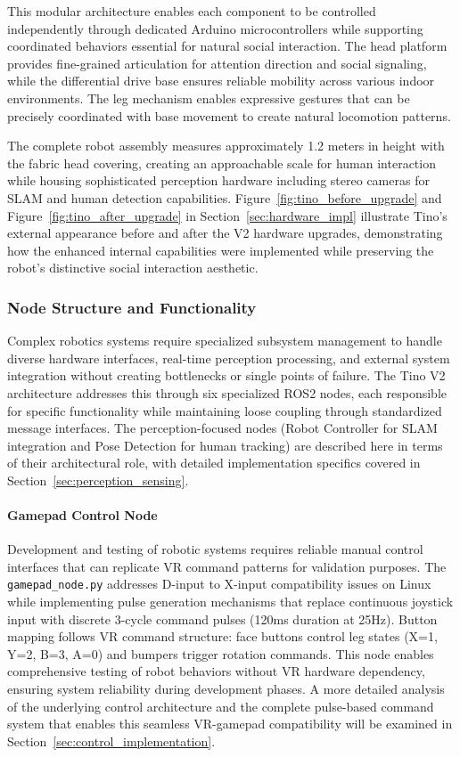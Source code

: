 This modular architecture enables each component to be controlled independently through dedicated Arduino microcontrollers while supporting coordinated behaviors essential for natural social interaction. The head platform provides fine-grained articulation for attention direction and social signaling, while the differential drive base ensures reliable mobility across various indoor environments. The leg mechanism enables expressive gestures that can be precisely coordinated with base movement to create natural locomotion patterns.

The complete robot assembly measures approximately 1.2 meters in height with the fabric head covering, creating an approachable scale for human interaction while housing sophisticated perception hardware including stereo cameras for SLAM and human detection capabilities. Figure~\ref{fig:tino_before_upgrade} and Figure~\ref{fig:tino_after_upgrade} in Section~\ref{sec:hardware_impl} illustrate Tino's external appearance before and after the V2 hardware upgrades, demonstrating how the enhanced internal capabilities were implemented while preserving the robot's distinctive social interaction aesthetic.

\subsubsection{Node Structure and Functionality}

Complex robotics systems require specialized subsystem management to handle diverse hardware interfaces, real-time perception processing, and external system integration without creating bottlenecks or single points of failure. The Tino V2 architecture addresses this through six specialized ROS2 nodes, each responsible for specific functionality while maintaining loose coupling through standardized message interfaces. The perception-focused nodes (Robot Controller for SLAM integration and Pose Detection for human tracking) are described here in terms of their architectural role, with detailed implementation specifics covered in Section~\ref{sec:perception_sensing}.

\paragraph{Gamepad Control Node}

Development and testing of robotic systems requires reliable manual control interfaces that can replicate VR command patterns for validation purposes. The \texttt{gamepad\_node.py} addresses D-input to X-input compatibility issues on Linux while implementing pulse generation mechanisms that replace continuous joystick input with discrete 3-cycle command pulses (120ms duration at 25Hz). Button mapping follows VR command structure: face buttons control leg states (X=1, Y=2, B=3, A=0) and bumpers trigger rotation commands. This node enables comprehensive testing of robot behaviors without VR hardware dependency, ensuring system reliability during development phases. A more detailed analysis of the underlying control architecture and the complete pulse-based command system that enables this seamless VR-gamepad compatibility will be examined in Section~\ref{sec:control_implementation}.

